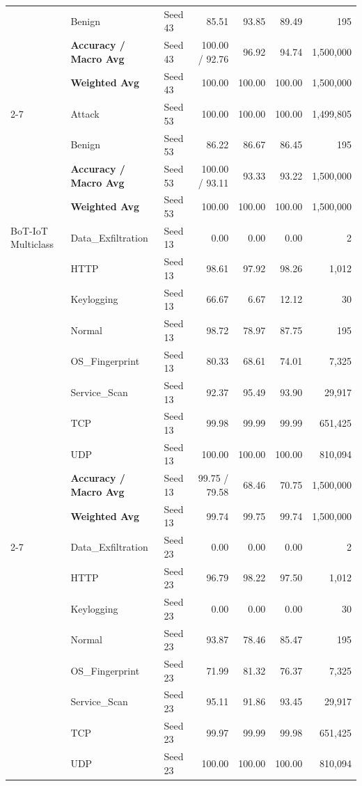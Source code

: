 \documentclass[a4paper,fleqn]{cas-sc}
\begin{document}
{\begin{landscape}
\begin{longtable}{lllrrrr}
 & Benign & Seed 43 & 85.51 & 93.85 & 89.49 & 195 \\
 & \textbf{Accuracy / Macro Avg} & Seed 43 & 100.00 / 92.76 & 96.92 & 94.74 & 1,500,000 \\
 & \textbf{Weighted Avg} & Seed 43 & 100.00 & 100.00 & 100.00 & 1,500,000 \\
\cline{2-7}
 & Attack & Seed 53 & 100.00 & 100.00 & 100.00 & 1,499,805 \\
 & Benign & Seed 53 & 86.22 & 86.67 & 86.45 & 195 \\
 & \textbf{Accuracy / Macro Avg} & Seed 53 & 100.00 / 93.11 & 93.33 & 93.22 & 1,500,000 \\
 & \textbf{Weighted Avg} & Seed 53 & 100.00 & 100.00 & 100.00 & 1,500,000 \\
\midrule
BoT-IoT Multiclass & Data\_Exfiltration & Seed 13 & 0.00 & 0.00 & 0.00 & 2 \\
 & HTTP & Seed 13 & 98.61 & 97.92 & 98.26 & 1,012 \\
 & Keylogging & Seed 13 & 66.67 & 6.67 & 12.12 & 30 \\
 & Normal & Seed 13 & 98.72 & 78.97 & 87.75 & 195 \\
 & OS\_Fingerprint & Seed 13 & 80.33 & 68.61 & 74.01 & 7,325 \\
 & Service\_Scan & Seed 13 & 92.37 & 95.49 & 93.90 & 29,917 \\
 & TCP & Seed 13 & 99.98 & 99.99 & 99.99 & 651,425 \\
 & UDP & Seed 13 & 100.00 & 100.00 & 100.00 & 810,094 \\
 & \textbf{Accuracy / Macro Avg} & Seed 13 & 99.75 / 79.58 & 68.46 & 70.75 & 1,500,000 \\
 & \textbf{Weighted Avg} & Seed 13 & 99.74 & 99.75 & 99.74 & 1,500,000 \\
\cline{2-7}
 & Data\_Exfiltration & Seed 23 & 0.00 & 0.00 & 0.00 & 2 \\
 & HTTP & Seed 23 & 96.79 & 98.22 & 97.50 & 1,012 \\
 & Keylogging & Seed 23 & 0.00 & 0.00 & 0.00 & 30 \\
 & Normal & Seed 23 & 93.87 & 78.46 & 85.47 & 195 \\
 & OS\_Fingerprint & Seed 23 & 71.99 & 81.32 & 76.37 & 7,325 \\
 & Service\_Scan & Seed 23 & 95.11 & 91.86 & 93.45 & 29,917 \\
 & TCP & Seed 23 & 99.97 & 99.99 & 99.98 & 651,425 \\
 & UDP & Seed 23 & 100.00 & 100.00 & 100.00 & 810,094 \\

\end{longtable}
\end{landscape}}
\end{document}
